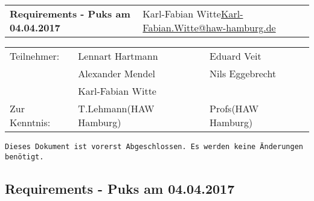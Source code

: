 \documentclass[
   draft=false
  ,paper=a4
  ,twoside=false
  ,fontsize=11pt
  ,headsepline
  ,DIV11
  ,parskip=full+
]{scrartcl} %
\begin{document}
\def\titel{Requirements - Puks am 04.04.2017}

\def\myName{Karl-Fabian Witte}
\def\myEmail{Karl-Fabian.Witte@haw-hamburg.de}


\def\teilnehmer{ 
	& Lennart Hartmann & Eduard Veit \\
	& Alexander Mendel   & Nils Eggebrecht\\
    & Karl-Fabian Witte   & \\
}

\def\zurKenntnis {
	& T.Lehmann(HAW Hamburg) & Profs(HAW Hamburg) \\
}



\newlength{\txtw} %
\setlength{\txtw}{\textwidth} %
\addtolength{\txtw}{-10\tabcolsep} %

\def\me{\myName \newline \footnotesize{\url{\myEmail} } }

\def\tablehead{
	\hline 
	\rowcolor{tabgrey}
	\textbf{Typ} & 
	\textbf{Resultat regulär} & 
	\textbf{gewünschte Rutsche voll} \\
	\hline 
	\endhead}
	
\begin{tabular}{p{0.65\txtw} p{0.35\txtw}}
	\textbf{\Large{\titel}} & \me  \\
\end{tabular}

\begin{tabular}{l p{0.4\txtw} p{0.4\txtw} }
	Teilnehmer: \teilnehmer
	Zur Kenntnis: \zurKenntnis
\end{tabular}
\texttt {Dieses Dokument ist vorerst Abgeschlossen. Es werden keine Änderungen benötigt.}
\subsection*{\titel}
\vspace{-1em}
\end{document}
